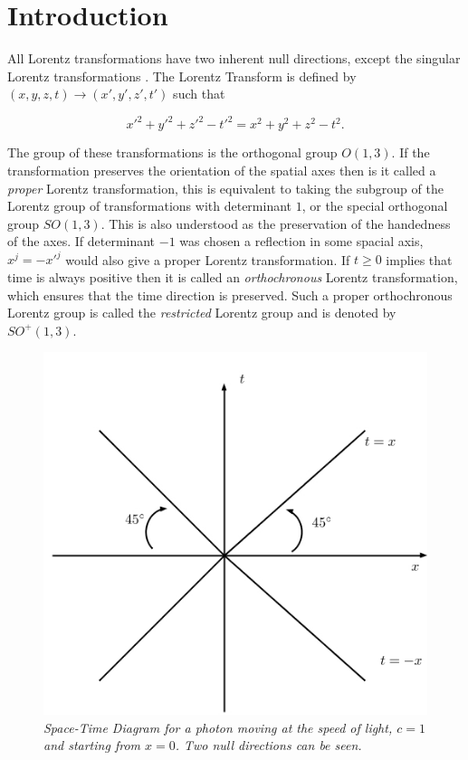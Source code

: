 \section{Introduction}

All Lorentz transformations have two inherent null directions, except the singular Lorentz transformations \cite[p. 85]{Relativity_Synge}. The Lorentz Transform is defined by $(x,y,z,t) \rightarrow (x',y',z',t')$ such that

\begin{equation*}
{x'}^2 + {y'}^2 + {z'}^2 - {t'}^2 = x^2 + y^2 + z^2 - t^2.
\end{equation*}

\noindent The group of these transformations is the orthogonal group $O(1,3)$. If the transformation preserves the orientation of the spatial axes then is it called a \textit{proper} Lorentz transformation, this is equivalent to taking the subgroup of the Lorentz group of transformations with determinant $1$, or the special orthogonal group $SO(1,3)$. This is also understood as the preservation of the handedness of the axes. If determinant $-1$ was chosen a reflection in some spacial axis, $x^j = -{x'}^j$ would also give a proper Lorentz transformation. If $t \geq 0$ implies that time is always positive then it is called an \textit{orthochronous} Lorentz transformation, which ensures that the time direction is preserved. Such a proper orthochronous Lorentz group is called the \textit{restricted} Lorentz group and is denoted by $SO^{+}(1,3)$. 

\begin{figure}[h!]
\begin{center}
\caption{\textit{Space-Time Diagram for a photon moving at the speed of light, $c=1$ and starting from $x = 0$. Two null directions can be seen.}}
\label{figure_Photon_Space_Time}
\includegraphics[scale=0.8]{figs/1_1.jpg}
\end{center}
\end{figure}

